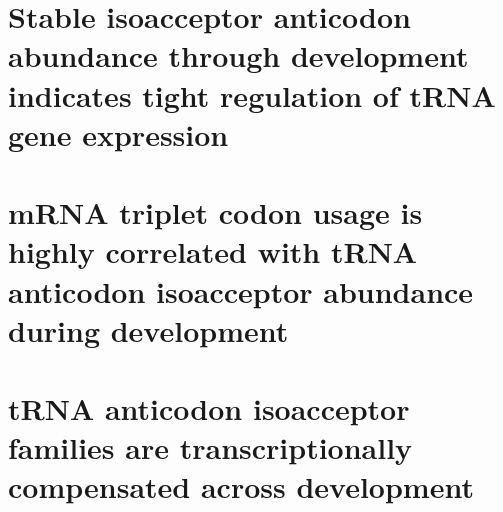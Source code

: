 \section{Stable isoacceptor anticodon abundance through development indicates
tight regulation of tRNA gene expression}

\section{mRNA triplet codon usage is highly correlated with tRNA anticodon
isoacceptor abundance during development}

\section{tRNA anticodon isoacceptor families are transcriptionally compensated
across development}
